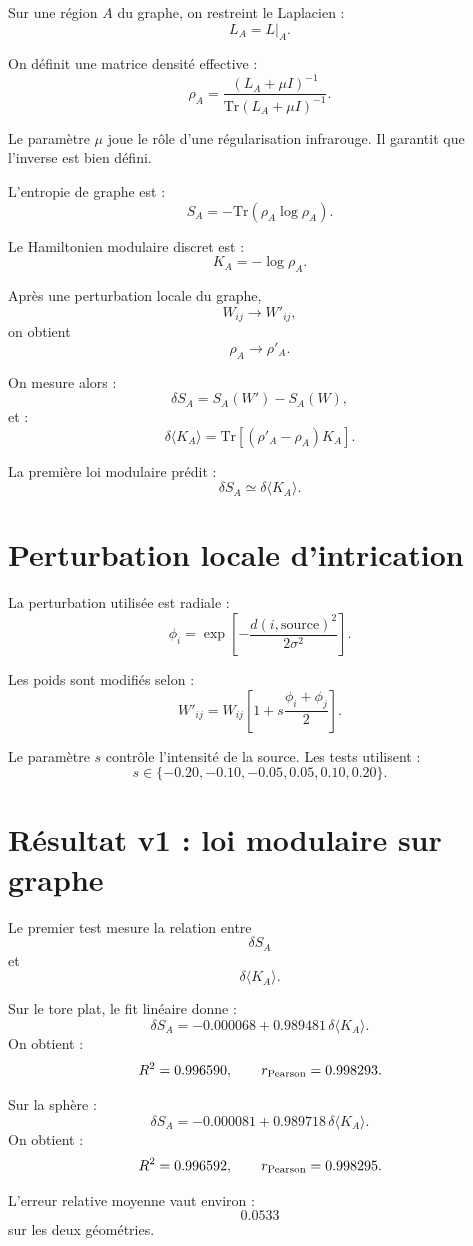 \documentclass[11pt,a4paper]{article}
\begin{document}
Sur une région \(A\) du graphe, on restreint le Laplacien :
\[
L_A=L|_A.
\]

On définit une matrice densité effective :
\[
\rho_A
=
\frac{(L_A+\mu I)^{-1}}
{\mathrm{Tr}(L_A+\mu I)^{-1}}.
\]

Le paramètre \(\mu\) joue le rôle d'une régularisation infrarouge. Il garantit
que l'inverse est bien défini.

L'entropie de graphe est :
\[
S_A
=
-\mathrm{Tr}(\rho_A\log\rho_A).
\]

Le Hamiltonien modulaire discret est :
\[
K_A=-\log\rho_A.
\]

Après une perturbation locale du graphe,
\[
W_{ij}
\to
W'_{ij},
\]
on obtient
\[
\rho_A\to\rho'_A.
\]

On mesure alors :
\[
\delta S_A
=
S_A(W')-S_A(W),
\]
et :
\[
\delta\langle K_A\rangle
=
\mathrm{Tr}\left[(\rho'_A-\rho_A)K_A\right].
\]

La première loi modulaire prédit :
\[
\delta S_A
\simeq
\delta\langle K_A\rangle.
\]

\section{Perturbation locale d'intrication}

La perturbation utilisée est radiale :
\[
\phi_i
=
\exp\left[
-\frac{d(i,\mathrm{source})^2}{2\sigma^2}
\right].
\]

Les poids sont modifiés selon :
\[
W'_{ij}
=
W_{ij}
\left[
1+s\frac{\phi_i+\phi_j}{2}
\right].
\]

Le paramètre \(s\) contrôle l'intensité de la source. Les tests utilisent :
\[
s\in\{-0.20,-0.10,-0.05,0.05,0.10,0.20\}.
\]

\section{Résultat v1 : loi modulaire sur graphe}

Le premier test mesure la relation entre
\[
\delta S_A
\]
et
\[
\delta\langle K_A\rangle.
\]

Sur le tore plat, le fit linéaire donne :
\[
\delta S_A
=
-0.000068
+
0.989481\,\delta\langle K_A\rangle.
\]
On obtient :
\[
R^2=0.996590,
\qquad
r_{\rm Pearson}=0.998293.
\]

Sur la sphère :
\[
\delta S_A
=
-0.000081
+
0.989718\,\delta\langle K_A\rangle.
\]
On obtient :
\[
R^2=0.996592,
\qquad
r_{\rm Pearson}=0.998295.
\]

L'erreur relative moyenne vaut environ :
\[
0.0533
\]
sur les deux géométries.
\end{document}
